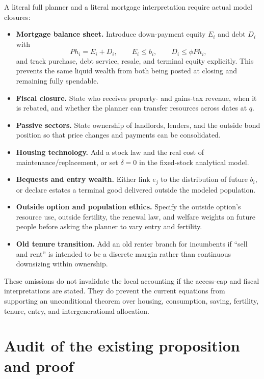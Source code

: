 \documentclass[11pt]{article}
\newcommand{\1}{\mathbf 1}
\begin{document}
A literal full planner and a literal mortgage interpretation require actual
model closures:
\begin{itemize}
\item \textbf{Mortgage balance sheet.} Introduce down-payment equity $E_i$ and
debt $D_i$ with
\[
P h_i=E_i+D_i,\qquad E_i\le b_i,\qquad D_i\le\phi P h_i,
\]
and track purchase, debt service, resale, and terminal equity explicitly. This
prevents the same liquid wealth from both being posted at closing and remaining
fully spendable.
\item \textbf{Fiscal closure.} State who receives property- and gains-tax
revenue, when it is rebated, and whether the planner can transfer resources
across dates at $q$.
\item \textbf{Passive sectors.} State ownership of landlords, lenders, and the
outside bond position so that price changes and payments can be consolidated.
\item \textbf{Housing technology.} Add a stock law and the real cost of
maintenance/replacement, or set $\delta=0$ in the fixed-stock analytical model.
\item \textbf{Bequests and entry wealth.} Either link $e_j$ to the distribution
of future $b_i$, or declare estates a terminal good delivered outside the
modeled population.
\item \textbf{Outside option and population ethics.} Specify the outside
option's resource use, outside fertility, the renewal law, and welfare weights
on future people before asking the planner to vary entry and fertility.
\item \textbf{Old tenure transition.} Add an old renter branch for incumbents
if ``sell and rent'' is intended to be a discrete margin rather than continuous
downsizing within ownership.
\end{itemize}

These omissions do not invalidate the local accounting if the access-cap and
fiscal interpretations are stated. They do prevent the current equations from
supporting an unconditional theorem over housing, consumption, saving,
fertility, tenure, entry, and intergenerational allocation.

\section{Audit of the existing proposition and proof}
\label{sec:audit}
\end{document}
